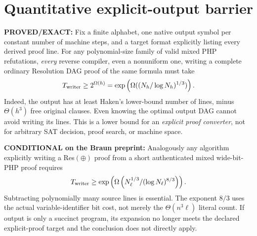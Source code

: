 \documentclass[11pt]{article}
\begin{document}
\section*{Quantitative explicit-output barrier}
\noindent\textbf{PROVED/EXACT:} Fix a finite alphabet, one native output symbol per constant number of machine steps, and a target format explicitly listing every derived proof line. For any polynomial-size family of valid mixed PHP refutations, \emph{every} reverse compiler, even a nonuniform one, writing a complete ordinary Resolution DAG proof of the same formula must take
\[
T_{\rm writer}\ge 2^{\Omega(h)}
 =\exp\left(\Omega((N_h/\log N_h)^{1/3})\right).
\]
Indeed, the output has at least Haken's lower-bound number of lines, minus $\Theta(h^3)$ free original clauses. Even knowing the optimal output DAG cannot avoid writing its lines. This is a lower bound for an \emph{explicit proof converter}, not for arbitrary SAT decision, proof search, or machine space.

\noindent\textbf{CONDITIONAL on the Braun preprint:} Analogously any algorithm explicitly writing a Res$(\oplus)$ proof from a short authenticated mixed wide-bit-PHP proof requires
\[
T_{\rm writer}\ge
 \exp\left(\Omega\left(N_\ell^{1/3}/(\log N_\ell)^{8/3}\right)\right).
\]
Subtracting polynomially many source lines is essential. The exponent $8/3$ uses the actual variable-identifier bit cost, not merely the $\Theta(n^3\ell)$ literal count. If output is only a succinct program, its expansion no longer meets the declared explicit-proof target and the conclusion does not directly apply.
\end{document}

